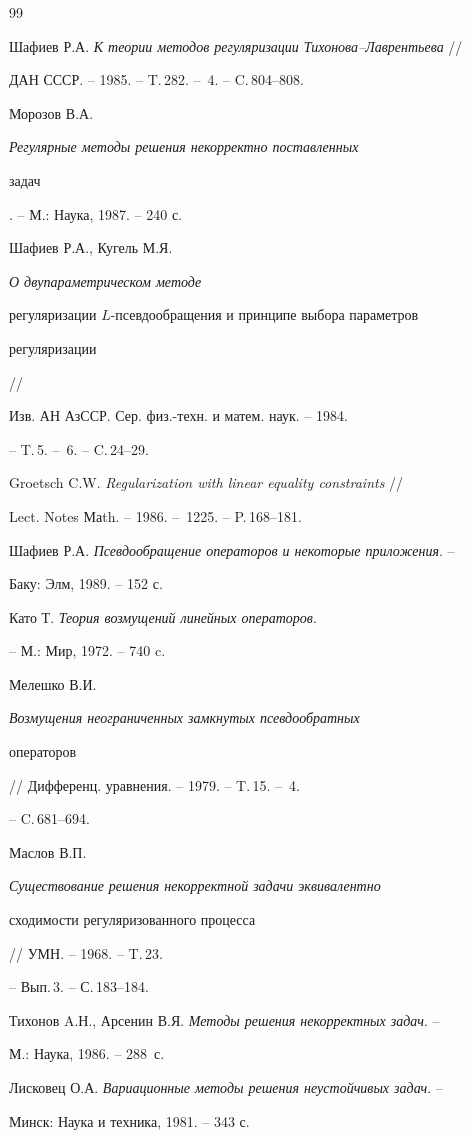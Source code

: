 \begin{thebibliography}{99} 


 




Шафиев Р.А. {\em К теории методов регуляризации Тихонова--Лаврентьева} // 


ДАН СССР. -- 1985. -- T.\,282. -- \No\,4. -- C.\,804--808. 




Морозов В.А. {\em Регулярные методы решения некорректно поставленных  


задач}. -- М.: Наука, 1987. -- 240 с. 




Шафиев Р.А., Кугель М.Я. {\em О двупараметрическом методе  


регуляризации $L$-псев\-до\-об\-ра\-ще\-ния и принципе выбора параметров  


регуляризации} //  


Изв. АН АзССР. Сер. физ.-техн. и матем. наук. -- 1984.


-- T.\,5. -- \No\,6. -- C.\,24--29. 




Groetsch C.W. {\em Regularization with linear equality constraints} // 


Lect. Notes Маth. -- 1986. -- \No\,1225. -- P.\,168--181. 




Шафиев Р.А. {\em Псевдообращение операторов и некоторые приложения}. -- 


Баку: Элм, 1989. -- 152 с. 




Като Т. {\em Теория возмущений линейных операторов}. 


-- М.: Мир, 1972. -- 740 c. 




Мелешко В.И. {\em Возмущения неограниченных замкнутых псевдообратных  


операторов} //  Дифференц. уравнения. -- 1979. -- T.\,15. -- \No\,4. 


-- C.\,681--694.  




Маслов В.П. {\em Существование решения некорректной задачи эквивалентно  


сходимости регуляризованного процесса} // УМН. -- 1968. -- T.\,23. 


-- Вып.\,3. -- С.\,183--184.  




Тихонов A.Н., Арсенин В.Я. {\em Методы решения некорректных задач}. -- 


М.: Наука, 1986. -- 288~с. 




Лисковец О.А. {\em Вариационные методы решения неустойчивых задач}. -- 


Минск: Наука и техника, 1981. -- 343 с. 


 


\end{thebibliography} 


